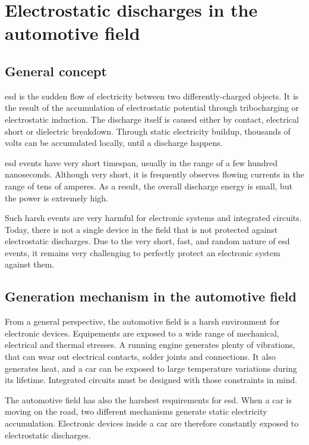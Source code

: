 \section{Electrostatic discharges in the automotive field}
\subsection{General concept}

\gls{esd} is the sudden flow of electricity between two differently-charged objects.
It is the result of the accumulation of electrostatic potential through tribocharging or electrostatic induction.
The discharge itself is caused either by contact, electrical short or dielectric breakdown.
Through static electricity buildup, thousands of volts can be accumulated locally, until a discharge happens.

\gls{esd} events have very short timespan, usually in the range of a few hundred nanoseconds.
Although very short, it is frequently observes flowing currents in the range of tens of amperes.
As a result, the overall discharge energy is small, but the power is extremely high.

Such harsh events are very harmful for electronic systems and integrated circuits.
Today, there is not a single device in the field that is not protected against electrostatic discharges.
Due to the very short, fast, and random nature of \gls{esd} events, it remains very challenging to perfectly protect an electronic system against them.

\subsection{Generation mechanism in the automotive field}

From a general perspective, the automotive field is a harsh environment for electronic devices.
Equipements are exposed to a wide range of mechanical, electrical and thermal stresses.
A running engine generates plenty of vibrations, that can wear out electrical contacts, solder joints and connections.
It also generates heat, and a car can be exposed to large temperature variations during its lifetime.
Integrated circuits must be designed with those constraints in mind.

The automotive field has also the harshest requirements for \gls{esd}.
When a car is moving on the road, two different mechanisms generate static electricity accumulation.
Electronic devices inside a car are therefore constantly exposed to electrostatic discharges.


